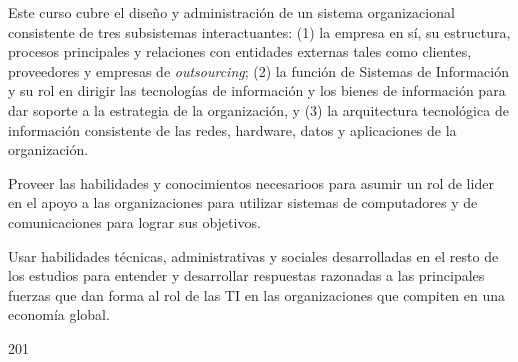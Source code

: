 \begin{syllabus}


\begin{justification}
Este curso cubre el diseño y administración de un sistema organizacional consistente de tres subsistemas interactuantes: (1) la empresa en sí­, su estructura, procesos principales y relaciones con entidades externas tales como clientes, proveedores y empresas de \emph{outsourcing}; (2) la función de Sistemas de Información y su rol en dirigir las tecnologías de información y los bienes de información para dar soporte a la estrategia de la organización, y (3) la arquitectura tecnológica de información consistente de las redes, hardware, datos y aplicaciones de la organización. 
\end{justification}

\begin{goals}
\item Proveer las habilidades y conocimientos necesarioos para asumir un rol de lider en el apoyo a las organizaciones para utilizar sistemas de computadores y de comunicaciones para lograr sus objetivos. 
\item Usar habilidades técnicas, administrativas y sociales desarrolladas en el resto de los estudios para entender y desarrollar respuestas razonadas a las principales fuerzas que dan forma al rol de las TI en las organizaciones que compiten en una economía global.
\end{goals}

\begin{outcomes}
\end{outcomes}

\begin{unit}{\LUTWOONETWODef}{\LUTWOONETWOBib}{20}{1}
   \begin{topics}
   	\item \OMCONETopicTWOxONExONEOH
   	\item \OMCONEONETopicTWOxONEONExONE
   	\item \OMCONEONETopicTWOxONEONExONEFIVE
	\item \OMCONETopicTWOxONExNINE
	\begin{subtopics}
		\item \OMCONETopicTWOxONExNINExSEVEN
		\item \OMCONETopicTWOxONExNINExEIGHT
		\item \OMCONETopicTWOxONExNINExNINE
	\end{subtopics} 	
   	\item \OMCTHREETopicTWOxTHREExTHREE
   	\item \OMCTWOTopicTWOxTWOxONEOH
   \end{topics}
	\LUTWOONETWOGoal
\end{unit}


\end{syllabus}

